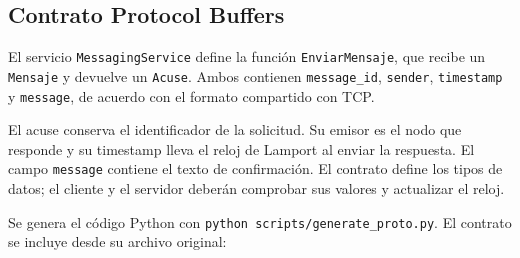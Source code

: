 \subsection{Contrato Protocol Buffers}
El servicio \texttt{MessagingService} define la función \texttt{EnviarMensaje},
que recibe un \texttt{Mensaje} y devuelve un \texttt{Acuse}.
Ambos contienen \texttt{message\_id}, \texttt{sender}, \texttt{timestamp}
y \texttt{message}, de acuerdo con el formato compartido con TCP.

El acuse conserva el identificador de la solicitud. Su emisor es el nodo que
responde y su timestamp lleva el reloj de Lamport al enviar la respuesta.
El campo \texttt{message} contiene el texto de confirmación.
El contrato define los tipos de datos; el cliente y el servidor deberán
comprobar sus valores y actualizar el reloj.

Se genera el código Python con \texttt{python scripts/generate\_proto.py}.
El contrato se incluye desde su archivo original:

